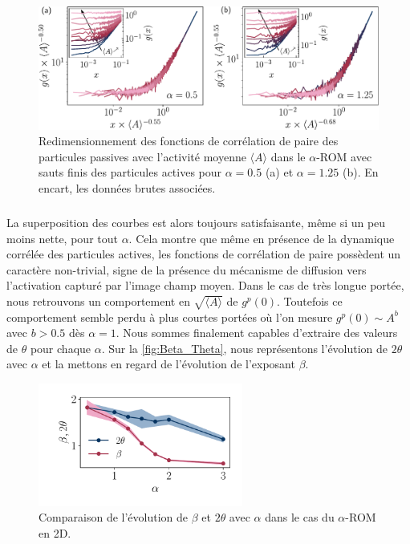 \begin{figure}[h]
	\centering
	\includegraphics[width=\textwidth]{Chapitre3/Figures/Interpretation/PCorr_alpha.pdf}
	\caption{Redimensionnement des fonctions de corrélation de paire des particules passives avec l'activité moyenne $\langle A \rangle$ dans le $\alpha$-ROM avec sauts finis des particules actives pour $\alpha = 0.5$ (a) et $\alpha=1.25$ (b). En encart, les données brutes associées.}
	\label{fig:PCorr_alpha}
\end{figure}

\subparagraph{}La superposition des courbes est alors toujours satisfaisante, même si un peu moins nette, pour tout $\alpha$. Cela montre que même en présence de la dynamique corrélée des particules actives, les fonctions de corrélation de paire possèdent un caractère non-trivial, signe de la présence du mécanisme de diffusion vers l'activation capturé par l'image champ moyen. Dans le cas de très longue portée, nous retrouvons un comportement en $\sqrt{\langle A \rangle}$ de $g^p(0)$. Toutefois ce comportement semble perdu à plus courtes portées où l'on mesure $g^p(0)\sim A^b$ avec $b>0.5$ dès $\alpha = 1$. Nous sommes finalement capables d'extraire des valeurs de $\theta$ pour chaque $\alpha$. Sur la \autoref{fig:Beta_Theta}, nous représentons l'évolution de $2\theta$ avec $\alpha$ et la mettons en regard de l'évolution de l'exposant $\beta$.

\begin{figure}[h]
	\centering
	\includegraphics[width=0.6\textwidth]{Chapitre3/Figures/Interpretation/Beta_Theta.pdf}
	\caption{Comparaison de l'évolution de $\beta$ et $2\theta$ avec $\alpha$ dans le cas du $\alpha$-ROM en 2D.}
	\label{fig:Beta_Theta}
\end{figure}

